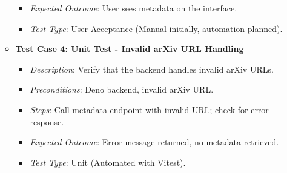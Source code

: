 \documentclass[12pt]{article}
\begin{document}
\begin{itemize}
\begin{itemize}
\begin{itemize}
          \item \textit{Expected Outcome}: User sees metadata on the interface.
          \item \textit{Test Type}: User Acceptance (Manual initially, automation planned).
        \end{itemize}
      \item \textbf{Test Case 4: Unit Test - Invalid arXiv URL Handling}
        \begin{itemize}
          \item \textit{Description}: Verify that the backend handles invalid arXiv URLs.
          \item \textit{Preconditions}: Deno backend, invalid arXiv URL.
          \item \textit{Steps}: Call metadata endpoint with invalid URL; check for error response.
          \item \textit{Expected Outcome}: Error message returned, no metadata retrieved.
          \item \textit{Test Type}: Unit (Automated with Vitest).
        \end{itemize}
    \end{itemize}


\end{itemize}
\end{document}
